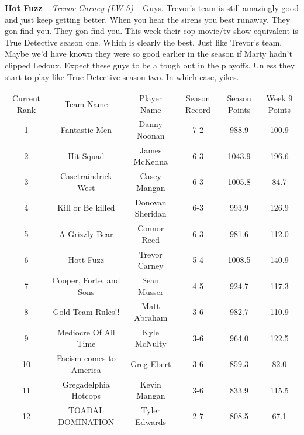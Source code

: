 \documentclass[11pt,letterpaper]{article}
\begin{document}
\begin{etaremune}
\item \textbf{Hot Fuzz} -- \textit{Trevor Carney (LW 5)} -- Guys. Trevor's team is still amazingly good and just keep getting better. When you hear the sirens you best runaway. They gon find you. They gon find you. This week their cop movie/tv show equivalent is True Detective season one. Which is clearly the best. Just like Trevor's team. Maybe we'd have known they were so good earlier in the season if Marty hadn't clipped Ledoux. Expect these guys to be a tough out in the playoffs. Unless they start to play like True Detective season two. In which case, yikes. 
\end{etaremune}


\newpage
{}
\vspace{-25pt}
\begin{table} [h]
\footnotesize
\begin{center}
\begin{tabular} { c c c c c c }
\\[3mm] Current Rank & Team Name & Player Name & Season Record &  Season Points & Week 9 Points
\\[3mm] 1 & Fantastic Men & Danny Noonan & 7-2 & 988.9 & 100.9
\\ 2 & Hit Squad & James McKenna & 6-3 & 1043.9 & 196.6
\\ 3 & Casetraindrick West & Casey Mangan & 6-3 & 1005.8 & 84.7
\\ 4 & Kill or Be killed & Donovan Sheridan & 6-3 & 993.9 & 126.9
\\ 5 & A Grizzly Bear & Connor Reed & 6-3 & 981.6 & 112.0
\\ 6 & Hott Fuzz & Trevor Carney & 5-4 & 1008.5 & 140.9
\\ 7 & Cooper, Forte, and Sons & Sean Musser & 4-5 & 924.7 & 117.3
\\ 8 & Gold Team Rules!! & Matt Abraham & 3-6 & 982.7 & 110.9
\\ 9 & Mediocre Of All Time & Kyle McNulty & 3-6 & 964.0 & 122.5
\\ 10 & Facism comes to America & Greg Ebert & 3-6 & 859.3 & 82.0
\\ 11 & Gregadelphia Hotcops & Kevin Mangan & 3-6 & 833.9 & 115.5
\\ 12 & TOADAL DOMINATION & Tyler Edwards & 2-7 & 808.5 & 67.1
\end{tabular}
\end{center}
\end{table}

\newpage
{}
\end{document}
